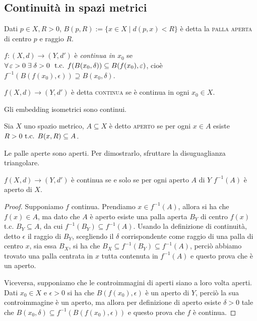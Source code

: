 \documentclass{article}
\begin{document}
\subsection{Continuità in spazi metrici}

\begin{defn}
    Dati $p \in X, R>0$, ${B(p, R):=\{ x \in X \mid d(p, x)<R\}}$ è detta la
    \textsc{palla aperta} di centro $p$ e raggio $R$.
\end{defn}

\begin{defn}
    ${f:(X, d) \rightarrow (Y, d')}$ è \textit{continua in $x_0$} se ${\forall
    \epsilon > 0 \; \exists \; \delta >0}\\\ \tc {f(B(x_0, \delta)) \subseteq
    B(f(x_0), \epsilon)}$, cioè ${f^{-1}(B(f(x_0), \epsilon)) \supseteq B(x_0,
    \delta)}$.
\end{defn}

\begin{defn}
    ${f(X, d) \rightarrow (Y, d')}$ è detta \textsc{continua} se è continua in
    ogni ${x_0 \in X}$.
\end{defn}

\begin{oss}
    Gli embedding isometrici sono continui.
\end{oss}

\begin{defn}
    Sia $X$ uno spazio metrico, $A \subseteq X$ è detto \textsc{aperto} se per
    ogni $x \in A$ esiste ${R>0 \text{ t.c. } B(x, R) \subseteq A}$.
\end{defn}

\begin{ftt}
    Le palle aperte sono aperti. Per dimostrarlo, sfruttare la disuguaglianza
    triangolare.
\end{ftt}

\begin{thm} \label{thm:cont_inv}
    $f(X, d) \rightarrow (Y, d')$ è continua se e solo se per ogni aperto $A$ di
    $Y$ $f^{-1}(A)$ è aperto di $X$.
\end{thm}

\begin{proof}
    Supponiamo $f$ continua. Prendiamo $x \in f^{-1}(A)$, allora si ha che $f(x)
    \in A$, ma dato che $A$ è aperto esiste una palla aperta $B_Y$ di centro
    $f(x)$
     t.c. $B_Y \subseteq A$, da cui $f^{-1}(B_Y) \subseteq f^{-1}(A)$.
    Usando la definizione di continuità, detto $\epsilon$ il raggio di $B_Y$,
    scegliendo il $\delta$ corrispondente come raggio di una palla di centro
    $x$, sia essa $B_X$, si ha che $B_X \subseteq f^{-1}(B_Y) \subseteq
    f^{-1}(A)$, perciò abbiamo trovato una palla centrata in $x$ tutta contenuta
    in $f^{-1}(A)$ e questo prova che è un aperto.

    Viceversa, supponiamo che le controimmagini di aperti siano a loro volta
    aperti. Dati $x_0 \in X$ e $\epsilon >0$ si ha che $B(f(x_0), \epsilon)$ è
    un aperto di $Y$, perciò la sua controimmagine è un aperto, ma allora per
    definizione di aperto esiste $\delta>0$ tale che $B(x_0, \delta) \subseteq
    f^{-1}(B(f(x_0), \epsilon))$ e questo prova che $f$ è continua.
\end{proof}
\end{document}
